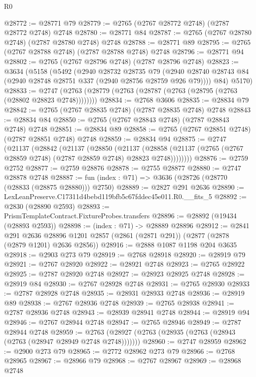 \begin{lexlean}{R0}
\begin{coremodule}
@28772 := @28771 @79
@28779 := @2765 (@2767 @28772 @2748) (@2787 @28772 @2748) @2748
@28780 := @28771 @84
@28787 := @2765 (@2767 @28780 @2748) (@2787 @28780 @2748) @2748
@28788 := @28771 @89
@28795 := @2765 (@2767 @28788 @2748) (@2787 @28788 @2748) @2748
@28796 := @28771 @94
@28802 := @2765 (@2767 @28796 @2748) (@2787 @28796 @2748)
@28823 := @3634
    (@5158
      (@5492
        (@2940
          @28732
          @28735
          @79
          (@2940 @28740 @28743 @84 (@2940 @28748 @28751 @337 (@2940 @28756 @28759 @926 @79))))
        @84)
      @5170)
@28833 := @2747 (@2763 (@28779 (@2763 (@28787 (@2763 (@28795 (@2763 (@28802 @28823 @2748))))))))
@28834 := @2768 @3606
@28835 := @28834 @79
@28842 := @2765 (@2767 @28835 @2748) (@2787 @28835 @2748) @2748
@28843 := @28834 @84
@28850 := @2765 (@2767 @28843 @2748) (@2787 @28843 @2748) @2748
@28851 := @28834 @89
@28858 := @2765 (@2767 @28851 @2748) (@2787 @28851 @2748) @2748
@28859 := @28834 @94
@28875 := @2747
    (@21137
      (@28842
        (@21137
          (@28850
            (@21137
              (@28858 (@21137 (@2765 (@2767 @28859 @2748) (@2787 @28859 @2748) @28823 @2748))))))))
@28876 := @2759 @2752
@28877 := @2759 @28876
@28878 := @2755 @28877
@28880 := @2747 @28878 @2748
@28887 := fun (index : @71) => @3636 (@28726 (@28770 (@28833 (@28875 @28880))) @2750)
@28889 := @2827 @291 @2636
@28890 := LexLeanPreserve.C17311d4bebd119bfb5c67fddec45e011.R0.__fits_5
@28892 := @2830 (@28890 @2593)
@28893 := PrismTemplateContract.FixtureProbes.transfers
@28896 := @28892 (@19434 (@28893 @2593))
@28898 := (index : @71) -> @28889 @28896
@28912 := @2841
    @291
    @2636
    @28896
    @1201
    @2857
    (@2861 (@2871 @291))
    (@2877 (@2878 (@2879 @1201) @2636 @2856))
@28916 := @2888 @1087 @1198 @204 @3635
@28918 := @2903 @273 @79
@28919 := @2768 @28918
@28920 := @28919 @79
@28921 := @2767 @28920
@28922 := @28921 @2748
@28923 := @2765 @28922
@28925 := @2787 @28920 @2748
@28927 := @28923 @28925 @2748
@28928 := @28919 @84
@28930 := @2767 @28928 @2748
@28931 := @2765 @28930
@28933 := @2787 @28928 @2748
@28935 := @28931 @28933 @2748
@28936 := @28919 @89
@28938 := @2767 @28936 @2748
@28939 := @2765 @28938
@28941 := @2787 @28936 @2748
@28943 := @28939 @28941 @2748
@28944 := @28919 @94
@28946 := @2767 @28944 @2748
@28947 := @2765 @28946
@28949 := @2787 @28944 @2748
@28959 := @2763 (@28927 (@2763 (@28935 (@2763 (@28943 (@2763 (@28947 @28949 @2748 @2748)))))))
@28960 := @2747 @28959
@28962 := @2900 @273 @79
@28965 := @2772 @28962 @273 @79
@28966 := @2768 @28965
@28967 := @28966 @79
@28968 := @2767 @28967
@28969 := @28968 @2748

\end{coremodule}
\end{lexlean}
